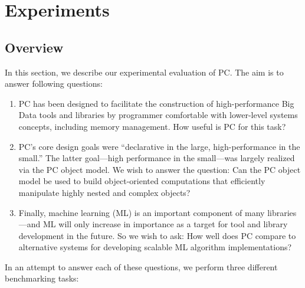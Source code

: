 
\section{Experiments}

\subsection{Overview}

In this section, we describe our experimental evaluation of PC.
The aim is to answer
following questions:

\begin {enumerate}
\item PC has been designed to facilitate the construction of high-performance Big Data tools and libraries by programmer
comfortable with lower-level systems concepts, including memory management.
How useful is PC for this task?
\item PC's core design goals were ``declarative in the large,
high-performance in the small.'' The latter goal---high performance in the small---was largely realized via the 
PC object model.  We wish to answer the question: Can the PC object model be used to build 
object-oriented computations
that efficiently manipulate highly nested and complex objects?
\item Finally, machine learning (ML) is an important component of many libraries---and ML will only increase in importance
as a target for tool and library development in the future.
So we wish to ask: How well does PC compare to alternative systems for developing scalable ML algorithm implementations?
\end {enumerate}

\noindent In an attempt to answer each of these questions, we perform three different benchmarking tasks:

